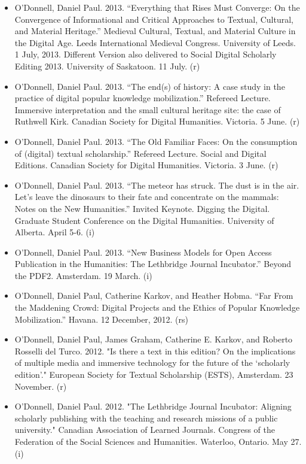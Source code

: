 \documentclass[12pt]{article}
\begin{document}
\begin{itemize}
  \item O'Donnell, Daniel Paul. 2013. “Everything that Rises Must Converge: On the Convergence of Informational and Critical Approaches to Textual, Cultural, and Material Heritage.” Medieval Cultural, Textual, and Material Culture in the Digital Age. Leeds International Medieval Congress. University of Leeds. 1 July, 2013. Different Version also delivered to Social Digital Scholarly Editing 2013. University of Saskatoon. 11 July. (r)
  \item O'Donnell, Daniel Paul. 2013. “The end(s) of history: A case study in the practice of digital popular knowledge mobilization.” Refereed Lecture. Immersive interpretation and the small cultural heritage site: the case of Ruthwell Kirk. Canadian Society for Digital Humanities. Victoria. 5 June. (r)
  \item O'Donnell, Daniel Paul. 2013. “The Old Familiar Faces: On the consumption of (digital) textual scholarship.” Refereed Lecture. Social and Digital Editions. Canadian Society for Digital Humanities. Victoria. 3 June. (r)
  \item O'Donnell, Daniel Paul. 2013. “The meteor has struck. The dust is in the air. Let’s leave the dinosaurs to their fate and concentrate on the mammals: Notes on the New Humanities.” Invited Keynote. Digging the Digital. Graduate Student Conference on the Digital Humanities. University of Alberta. April 5-6. (i)
  \item O'Donnell, Daniel Paul. 2013. “New Business Models for Open Access Publication in the Humanities: The Lethbridge Journal Incubator.” Beyond the PDF2. Amsterdam. 19 March. (i)
  \item O'Donnell, Daniel Paul, Catherine Karkov, and Heather Hobma\*. “Far From the Maddening Crowd: Digital Projects and the Ethics of Popular Knowledge Mobilization.” Havana. 12 December, 2012. (rs)
  \item O'Donnell, Daniel Paul, James Graham, Catherine E. Karkov, and Roberto Rosselli del Turco. 2012. "Is there a text in this edition? On the implications of multiple media and immersive technology for the future of the ‘scholarly edition’." European Society for Textual Scholarship (ESTS), Amsterdam. 23 November. (r)
  \item O'Donnell, Daniel Paul. 2012. "The Lethbridge Journal Incubator: Aligning scholarly publishing with the teaching and research missions of a public university." Canadian Association of Learned Journals. Congress of the Federation of the Social Sciences and Humanities. Waterloo, Ontario. May 27. (i)

\end{itemize}
\end{document}
